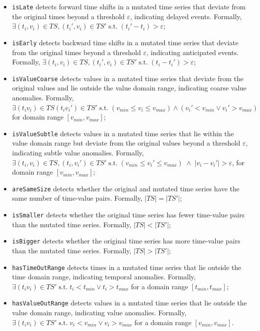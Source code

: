 {\begin{itemize}
    \item \texttt{isLate} detects forward time shifts in a mutated time series that deviate from the original times beyond a threshold $\varepsilon$, indicating delayed events. Formally, $\exists (t_i, v_i) \in TS, (t_i', v_i) \in TS' \;\text{s.t.}\; (t_i' - t_i) > \varepsilon$;
    \item \texttt{isEarly} detects backward time shifts in a mutated time series that deviate from the original times beyond a threshold $\varepsilon$, indicating anticipated events. Formally, $\exists (t_i, v_i) \in TS, (t_i', v_i) \in TS' \;\text{s.t.}\; (t_i - t_i') > \varepsilon$;
    \item \texttt{isValueCoarse} detects values in a mutated time series that deviate from the original values and lie outside the value domain range, indicating coarse value anomalies. Formally, $\exists (t_i v_i) \in TS (t_i v_i') \in TS' \;\text{s.t.}\; (v_{min} \le v_i \le v_{max}) \land (v_i' < v_{min} \lor v_i' > v_{max}) $ for domain range $[v_{min}, v_{max}]$;
    \item \texttt{isValueSubtle} detects values in a mutated time series that lie within the value domain range but deviate from the original values beyond a threshold $\varepsilon$, indicating subtle value anomalies. Formally, $\exists (t_i, v_i) \in TS, (t_i, v_i') \in TS' \;\text{s.t.}\; (v_{min} \le v_i' \le v_{max}) \;\wedge\; |v_i - v_i'| > \varepsilon$, for domain range $[v_{min}, v_{max}]$;
    \item \texttt{areSameSize} detects whether the original and mutated time series have the same number of time-value pairs. Formally, $|TS| = |TS'|$;
    \item \texttt{isSmaller} detects whether the original time series has fewer time-value pairs than the mutated time series. Formally, $|TS| < |TS'|$;
    \item \texttt{isBigger} detects whether the original time series has more time-value pairs than the mutated time series. Formally, $|TS| > |TS'|$;
    \item \texttt{hasTimeOutRange} detects times in a mutated time series that lie outside the time domain range, indicating temporal anomalies. Formally, $\exists (t_i v_i) \in TS' \;\text{s.t.}\; t_i < t_{min} \lor t_i > t_{max} $ for a domain range $[t_{min}, t_{max}]$;
    \item \texttt{hasValueOutRange} detects values in a mutated time series that lie outside the value domain range, indicating value anomalies. Formally, $\exists (t_i v_i) \in TS' \;\text{s.t.}\; v_i < v_{min} \lor v_i > v_{max} $ for a domain range $[v_{min}, v_{max}]$.
\end{itemize}
}






